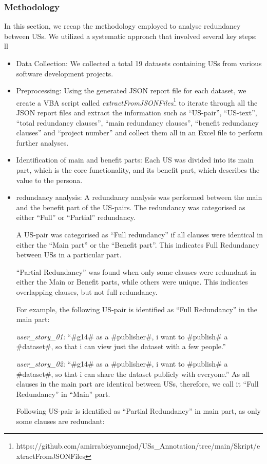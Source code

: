 \subsubsection*{Methodology}
In this section, we recap the methodology employed to analyse redundancy between USs. We utilized a systematic approach that involved several key steps:
ll\begin{itemize}
	\item Data Collection: We collected a total 19 datasets containing USs from various software development projects.
	\item Preprocessing: Using the generated JSON report file for each dataset, we create a VBA script called \textit{extractFromJSONFiles}\footnote{https://github.com/amirrabieyannejad/USs\_Annotation/tree/main/Skript/extractFromJSONFiles} to iterate through all the JSON report files and extract the information such as \enquote{US-pair}, \enquote{US-text}, \enquote{total redundancy clauses}, \enquote{main redundancy clauses}, \enquote{benefit redundancy clauses} and \enquote{project number} and collect them all in an Excel file to perform further analyses.
	\item Identification of main and benefit parts: Each US was divided into its main part, which is the core functionality, and its benefit part, which describes the value to the persona.
	\item redundancy analysis: A redundancy analysis was performed between the main and the benefit part of the US-pairs. The redundancy was categorised as either \enquote{Full} or \enquote{Partial} redundancy.
	
	A US-pair was categorised as \enquote{Full redundancy} if all clauses were identical in either the \enquote{Main part} or the \enquote{Benefit part}. This indicates Full Redundancy between USs in a particular part.
	
	\enquote{Partial Redundancy} was found when only some clauses were redundant in either the Main or Benefit parts, while others were unique. This indicates overlapping clauses, but not full redundancy.
	
	\begin{example}
		For example, the following US-pair is identified as \enquote{Full Redundancy} in the main part:
		
		\textit{user\_story\_01:} \enquote{\#g14\# as a \#publisher\#, i want to \#publish\# a \#dataset\#, so that i can view just the dataset with a few people.}
		
		\textit{user\_story\_02:} \enquote{\#g14\# as a \#publisher\#, i want to \#publish\# a \#dataset\#, so that i can share the dataset publicly with everyone.}	
		 As all clauses in the main part are identical between USs, therefore, we call it \enquote{Full Redundancy} in \enquote{Main} part.
	\end{example}
	\begin{example}
		Following US-pair is identified as \enquote{Partial Redundancy} in main part, as only some clauses are redundant:
		

\end{example}
\end{itemize}
